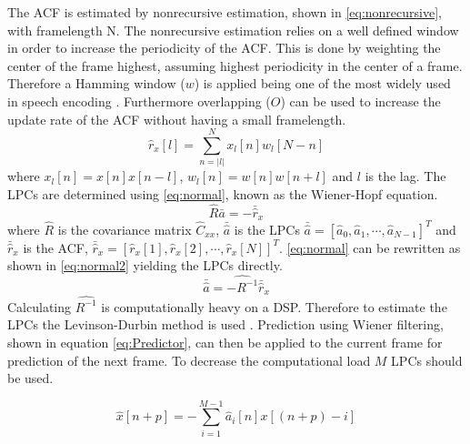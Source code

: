 The ACF is estimated by nonrecursive estimation, shown in \autoref{eq:nonrecursive}, with framelength N. The nonrecursive estimation relies on a well defined window in order to increase the periodicity of the ACF. This is done by weighting the center of the frame highest, assuming highest periodicity in the center of a frame. Therefore a Hamming window ($w$) is applied being one of the most widely used in speech encoding \cite{LinearPrediction}. Furthermore overlapping ($O$) can be used to increase the update rate of the ACF without having a small framelength.  
\begin{equation}\label{eq:nonrecursive}
\hat{r}_x[l] = \sum^{N}_{n=\left| l\right|} x_l[n]w_l[N-n]
\end{equation}
where $x_l[n]=x[n]x[n-l]$, $w_l[n]=w[n]w[n+l]$ and $l$ is the lag. The LPCs are determined using \autoref{eq:normal}, known as the Wiener-Hopf equation.
\begin{equation}\label{eq:normal}
\hat{R}  \bar{a} = -\bar{\hat{r}}_x
\end{equation}
where $\hat{R}$ is the covariance matrix $\hat{C}_{xx}$, $\bar{\hat{a}}$ is the LPCs $\bar{\hat{a}} = [\hat{a}_0 , \hat{a}_1, \cdots, \hat{a}_{N-1}]^T$ and $\bar{\hat{r}}_x$ is the ACF, $\bar{\hat{r}}_x = [\hat{r}_x[1] , \hat{r}_x[2], \cdots, \hat{r}_x[N]]^T$. \autoref{eq:normal} can be rewritten as shown in \autoref{eq:normal2} yielding the LPCs directly.  
 \begin{equation}\label{eq:normal2}
\bar{\hat{a}} = \hat{-R^{-1}} \bar{\hat{r}}_x
\end{equation}
Calculating $\hat{R^{-1}}$ is computationally heavy on a DSP. Therefore to estimate the LPCs the Levinson-Durbin method is used \cite{LinearPrediction}. Prediction using Wiener filtering, shown in equation \ref{eq:Predictor}, can then be applied to the current frame for prediction of the next frame. To decrease the computational load $M$ LPCs should be used. 

\begin{equation}\label{eq:Predictor}
\hat{x}[n+p] =- \sum^{M-1}_{i=1}\hat{a}_i[n]x[(n+p)-i]
\end{equation}

